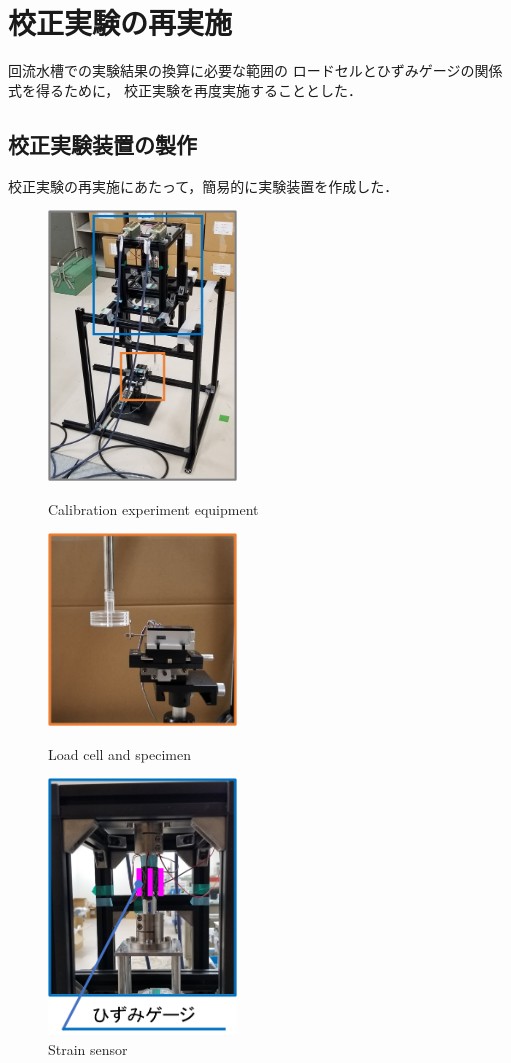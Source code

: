 \documentclass[twocolumn,a4j]{jsarticle}
\begin{document}
\section{校正実験の再実施}
回流水槽での実験結果の換算に必要な範囲の
ロードセルとひずみゲージの関係式を得るために，
校正実験を再度実施することとした．

\subsection{校正実験装置の製作}

校正実験の再実施にあたって，簡易的に実験装置を作成した．

\begin{figure}[htbp]
    \footnotesize
    \begin{center}
        \includegraphics[width=50mm]{../images/image_05.png}
        \caption{Calibration experiment equipment}
        \includegraphics[width=50mm]{../images/image_06.png}
        \caption{Load cell and specimen}
        \includegraphics[width=50mm]{../images/image_07.png}
        \caption{Strain sensor}
    \end{center}
\end{figure}
\end{document}
